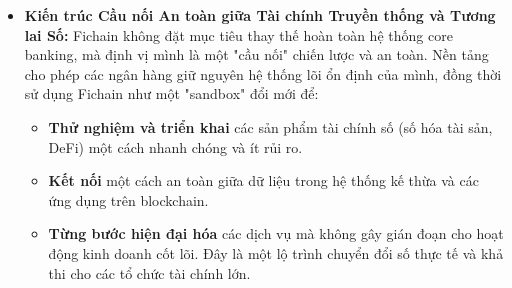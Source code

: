 \begin{itemize}
  \item \textbf{Kiến trúc Cầu nối An toàn giữa Tài chính Truyền thống và Tương lai Số:}
    Fichain không đặt mục tiêu thay thế hoàn toàn hệ thống core banking, mà định vị mình là một "cầu nối" chiến lược và an toàn. Nền tảng cho phép các ngân hàng giữ nguyên hệ thống lõi ổn định của mình, đồng thời sử dụng Fichain như một "sandbox" đổi mới để:
    \begin{itemize}
        \item \textbf{Thử nghiệm và triển khai} các sản phẩm tài chính số (số hóa tài sản, DeFi) một cách nhanh chóng và ít rủi ro.
        \item \textbf{Kết nối} một cách an toàn giữa dữ liệu trong hệ thống kế thừa và các ứng dụng trên blockchain.
        \item \textbf{Từng bước hiện đại hóa} các dịch vụ mà không gây gián đoạn cho hoạt động kinh doanh cốt lõi. Đây là một lộ trình chuyển đổi số thực tế và khả thi cho các tổ chức tài chính lớn.
    \end{itemize}

\end{itemize}
